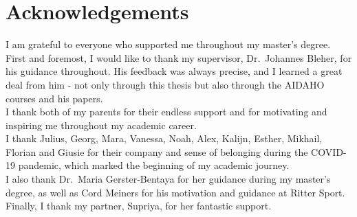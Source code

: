 \documentclass[12pt, a4paper]{article}
\begin{document}
\newpage
\pagestyle{empty}
\section*{Acknowledgements}

I am grateful to everyone who supported me throughout my master's degree. First and foremost, I would like to thank my supervisor, Dr.\ Johannes Bleher, for his guidance throughout. His feedback was always precise, and I learned a great deal from him - not only through this thesis but also through the AIDAHO courses and his papers. \\
I thank both of my parents for their endless support and for motivating and inspiring me throughout my academic career. \\
I thank Julius, Georg, Mara, Vanessa, Noah, Alex, Kalijn, Esther, Mikhail, Florian and Giusie for their company and sense of belonging during the COVID-19 pandemic, which marked the beginning of my academic journey. \\
I also thank Dr.\ Maria Gerster-Bentaya for her guidance during my master's degree, as well as Cord Meiners for his motivation and guidance at Ritter Sport. \\
Finally, I thank my partner, Supriya, for her fantastic support.

\newpage
\tableofcontents

\begin{singlespacing}
\listoffigures
{}
\listoftables
{}
\end{singlespacing}


\newpage
\pagestyle{fancy}


\newpage

\newpage

\newpage

\newpage

\newpage

\newpage

\newpage

\newpage

\printbibliography[heading=bibintoc, title={References}]
\newpage

\newpage
\begin{appendices}

\end{appendices}
\end{document}
